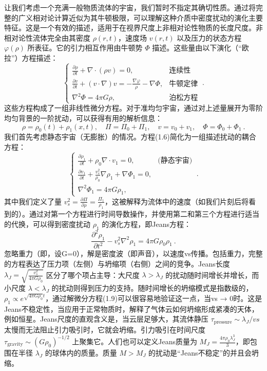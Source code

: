 让我们考虑一个充满一般物质流体的宇宙，我们暂时不指定其确切性质。通过将完整的广义相对论计算近似为其牛顿极限，可以理解这种介质中密度扰动的演化主要特征。这是一个有效的描述，适用于在视界尺度上非相对论性物质的长度尺度。非相对论性流体完全由其密度 \( \rho(r, t) \)，速度场 \( v(r, t) \) 以及压力的状态方程 \( \varphi(\rho) \) 所表征。它的引力相互作用由牛顿势 \( \Phi \) 描述。这些量由以下演化（“欧拉”）方程描述：
\begin{equation} \begin{cases} 
\frac{\partial \rho}{\partial t} + \nabla \cdot (\rho v) = 0, & \text{连续性} \\
\frac{\partial v}{\partial t} + (v \cdot \nabla)v = -\frac{\nabla \varphi}{\rho} - \nabla \Phi, & \text{牛顿定律} \\
\nabla^2 \Phi = 4\pi G \rho, & \text{泊松方程}
\end{cases} ~.
\end{equation} 
这些方程构成了一组非线性微分方程。对于准均匀宇宙，通过对上述量展开为零阶均匀背景的一阶扰动，可以获得有用的解析信息：
\begin{equation} 
\rho = \rho_0(t) + \rho_1(x, t), \quad \Pi = \Pi_0 + \Pi_1, \quad v = v_0 + v_1, \quad \Phi = \Phi_0 + \Phi_1~. 
\end{equation}
我们首先考虑静态宇宙（无膨胀）的情况。方程(1.6)简化为一组描述扰动的耦合方程：
\begin{equation}
\begin{cases} 
\frac{\partial \rho_1}{\partial t} + \rho_0 \nabla \cdot v_1 = 0, & \text{(静态宇宙)} \\
\frac{\partial v_1}{\partial t} + \frac{v^2_s}{\rho_0} \nabla \rho_1 + \nabla \Phi_1 = 0, \\
\nabla^2 \Phi_1 = 4\pi G \rho_1,
\end{cases} ~.
\end{equation}
其中我们定义了量 \( v^2_s = \frac{\partial \Pi}{\partial \rho} = \frac{\Pi_1}{\rho_1} \)，这被解释为流体中的速度（如我们片刻后将看到的）。通过对第一个方程进行时间导数操作，并使用第二和第三个方程进行适当的代换，可以得到密度扰动 \( \rho_1 \) 的演化方程，即Jeans方程：
\begin{equation}
\frac{\partial^2 \rho_1}{\partial t^2} - v^2_s \nabla^2 \rho_1 = 4\pi G \rho_0 \rho_1~.
\end{equation}
忽略重力（即，设G=0），解是密度波（即声音），以速度vs传播。包括重力，完整的方程表达了压力项（左侧）与坍缩项（右侧）之间的竞争。Jeans长度 \( \lambda_J = \sqrt{\frac{v^2_s}{4\pi G \rho_0}} \) 区分了哪个项占主导：大尺度 \( \lambda > \lambda_J \) 的扰动随时间增长并增长，而小尺度 \( \lambda < \lambda_J \) 的扰动则得到压力的支持。随时间增长的坍缩模式是指数级的，\( \rho_1 \propto e^{\sqrt{4\pi G \rho_0} t} \)，通过解微分方程(1.9)可以很容易地验证这一点，当vs → 0时。这是Jeans不稳定性，当应用于正常物质时，解释了气体云如何坍缩形成紧凑的天体，例如恒星。Jeans尺度的直观含义是，当云层足够大，其流体静压 \( \tau_{\text{pressure}} \sim \lambda_J / vs \) 太慢而无法阻止引力吸引时，它就会坍缩。引力吸引在时间尺度 \( \tau_{\text{gravity}} \sim (G\rho_0)^{-1/2} \) 上聚集它。人们也可以定义Jeans质量为 \( M_J = \frac{4\pi \rho_0 \lambda^3_J}{3} \)，即包围在半径 \( \lambda_J \) 的球体内的质量。质量 \( M > M_J \) 的扰动是“Jeans不稳定”的并且会坍缩。

 

